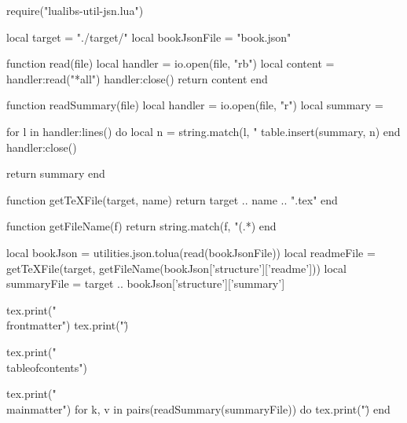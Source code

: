 \documentclass[10pt, a4, oneside]{ltjsbook}
\begin{document}
\begin{luacode*}
  require("lualibs-util-jsn.lua")

  local target = "./target/"
  local bookJsonFile = "book.json"

  function read(file)
    local handler = io.open(file, "rb")
    local content = handler:read("*all")
    handler:close()
    return content
  end

  function readSummary(file)
    local handler = io.open(file, "r")
    local summary = {}

    for l in handler:lines() do
      local n = string.match(l, "%
      table.insert(summary, n)
    end
    handler:close()

    return summary
  end

  function getTeXFile(target, name)
    return target .. name .. ".tex"
  end

  function getFileName(f)
    return string.match(f, "(.*)%
  end

  local bookJson = utilities.json.tolua(read(bookJsonFile))
  local readmeFile  = getTeXFile(target, getFileName(bookJson['structure']['readme']))
  local summaryFile = target .. bookJson['structure']['summary']

  tex.print("\\frontmatter")
  tex.print("\")

  tex.print("\\tableofcontents")

  tex.print("\\mainmatter")
  for k, v in pairs(readSummary(summaryFile)) do
    tex.print("\")
  end
\end{luacode*}
\end{document}
